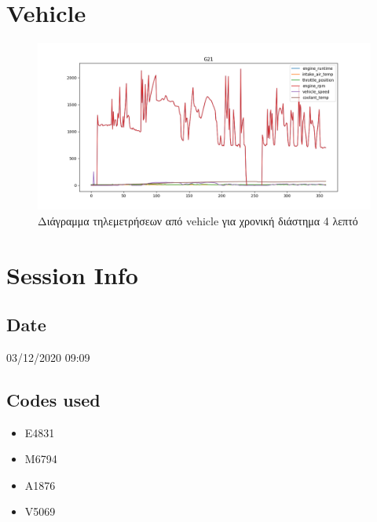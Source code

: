 \documentclass{article}
\begin{document}
\section{Vehicle}

\begin{figure}[H]
  \begin{center}
    \includegraphics[width=\textwidth]{G21.png}
  \end{center}
  \caption{Διάγραμμα τηλεμετρήσεων από vehicle για χρονική διάστημα 4 λεπτό}
\end{figure}

\section{Session Info}

\subsection{Date}
03/12/2020 09:09

\subsection{Codes used}
\begin{itemize}
  \item E4831
  \item M6794
  \item A1876
  \item V5069
\end{itemize}
\end{document}

